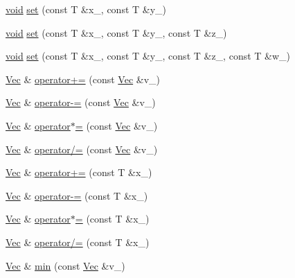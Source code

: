 \begin{DoxyCompactItemize}
\item 
\hyperlink{namespacetrimesh_a784ddfd979e1c579bda795a8edfc3f43}{void} \hyperlink{classtrimesh_1_1Vec_a5f3bc167ab76a74f2fc6948bf89053e9}{set} (const T \&x\+\_\+, const T \&y\+\_\+)
\item 
\hyperlink{namespacetrimesh_a784ddfd979e1c579bda795a8edfc3f43}{void} \hyperlink{classtrimesh_1_1Vec_a6d413017fad20795340af7a7782ec9ee}{set} (const T \&x\+\_\+, const T \&y\+\_\+, const T \&z\+\_\+)
\item 
\hyperlink{namespacetrimesh_a784ddfd979e1c579bda795a8edfc3f43}{void} \hyperlink{classtrimesh_1_1Vec_a2af3a23c74de67de33d5cc5d1caaa87a}{set} (const T \&x\+\_\+, const T \&y\+\_\+, const T \&z\+\_\+, const T \&w\+\_\+)
\item 
\hyperlink{classtrimesh_1_1Vec}{Vec} \& \hyperlink{classtrimesh_1_1Vec_a85f711a251416207c95b82dbfc3e0706}{operator+=} (const \hyperlink{classtrimesh_1_1Vec}{Vec} \&v\+\_\+)
\item 
\hyperlink{classtrimesh_1_1Vec}{Vec} \& \hyperlink{classtrimesh_1_1Vec_a067d4171230e95c421e7cfbc9054b2c3}{operator-\/=} (const \hyperlink{classtrimesh_1_1Vec}{Vec} \&v\+\_\+)
\item 
\hyperlink{classtrimesh_1_1Vec}{Vec} \& \hyperlink{classtrimesh_1_1Vec_a1094db69116d319cabca7aa09a20463d}{operator$\ast$=} (const \hyperlink{classtrimesh_1_1Vec}{Vec} \&v\+\_\+)
\item 
\hyperlink{classtrimesh_1_1Vec}{Vec} \& \hyperlink{classtrimesh_1_1Vec_ab6b99a90ec05a79286a19dd1d5012208}{operator/=} (const \hyperlink{classtrimesh_1_1Vec}{Vec} \&v\+\_\+)
\item 
\hyperlink{classtrimesh_1_1Vec}{Vec} \& \hyperlink{classtrimesh_1_1Vec_ad4aa4f1a863bcb61e8989f26e348f6c4}{operator+=} (const T \&x\+\_\+)
\item 
\hyperlink{classtrimesh_1_1Vec}{Vec} \& \hyperlink{classtrimesh_1_1Vec_ae336ff8bf90960b1da48d9a5fd093b35}{operator-\/=} (const T \&x\+\_\+)
\item 
\hyperlink{classtrimesh_1_1Vec}{Vec} \& \hyperlink{classtrimesh_1_1Vec_aad3f61a9a6a81dcfcf69e7633328f721}{operator$\ast$=} (const T \&x\+\_\+)
\item 
\hyperlink{classtrimesh_1_1Vec}{Vec} \& \hyperlink{classtrimesh_1_1Vec_a68ea46ba41132374ed9be9fb51fec445}{operator/=} (const T \&x\+\_\+)
\item 
\hyperlink{classtrimesh_1_1Vec}{Vec} \& \hyperlink{classtrimesh_1_1Vec_a8b8ab7f38bfcf8c82fbca33d49ca6bd6}{min} (const \hyperlink{classtrimesh_1_1Vec}{Vec} \&v\+\_\+)
\item 

\end{DoxyCompactItemize}
